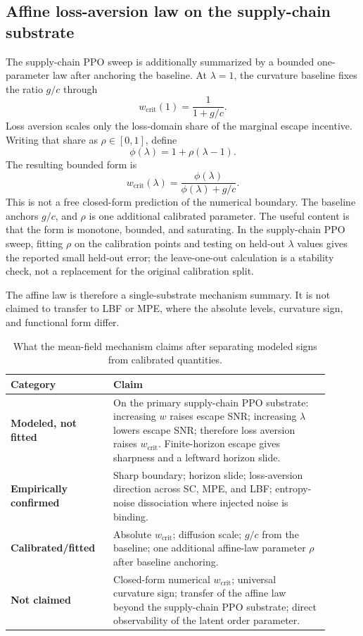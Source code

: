\documentclass[letterpaper]{article} %
\theoremstyle{plain}
\newcommand{\wcrit}{w_{\mathrm{crit}}}
\begin{document}
\subsection{Affine loss-aversion law on the supply-chain substrate}
The supply-chain PPO sweep is additionally summarized by a bounded one-parameter law after anchoring
the baseline. At $\lambda=1$, the curvature baseline fixes the ratio $g/c$ through
\begin{equation}
 \wcrit(1)=\frac{1}{1+g/c}.
\end{equation}
Loss aversion scales only the loss-domain share of the marginal escape incentive. Writing that
share as $\rho\in[0,1]$, define
\begin{equation}
 \phi(\lambda)=1+\rho(\lambda-1).
\end{equation}
The resulting bounded form is
\begin{equation}
 \wcrit(\lambda)=\frac{\phi(\lambda)}{\phi(\lambda)+g/c}.
 \label{eq:wcrit_lambda}
\end{equation}
This is not a free closed-form prediction of the numerical boundary. The baseline anchors $g/c$,
and $\rho$ is one additional calibrated parameter. The useful content is that the form is monotone,
bounded, and saturating. In the supply-chain PPO sweep, fitting $\rho$ on the calibration points and
testing on held-out $\lambda$ values gives the reported small held-out error; the leave-one-out
calculation is a stability check, not a replacement for the original calibration split.

The affine law is therefore a single-substrate mechanism summary. It is not claimed to transfer to
LBF or MPE, where the absolute levels, curvature sign, and functional form differ.

\begin{table}[t]
\centering
\caption{What the mean-field mechanism claims after separating modeled signs from calibrated
quantities.}
\label{tab:ledger_full}
\small
\begin{tabular}{p{0.28\linewidth}p{0.62\linewidth}}
\toprule
\textbf{Category} & \textbf{Claim} \\
\midrule
\textbf{Modeled, not fitted} &
On the primary supply-chain PPO substrate: increasing $w$ raises escape SNR; increasing $\lambda$
lowers escape SNR; therefore loss aversion raises $\wcrit$. Finite-horizon escape gives sharpness
and a leftward horizon slide. \\
\midrule
\textbf{Empirically confirmed} &
Sharp boundary; horizon slide; loss-aversion direction across SC, MPE, and LBF; entropy-noise
dissociation where injected noise is binding. \\
\midrule
\textbf{Calibrated/fitted} &
Absolute $\wcrit$; diffusion scale; $g/c$ from the baseline; one additional affine-law parameter
$\rho$ after baseline anchoring. \\
\midrule
\textbf{Not claimed} &
Closed-form numerical $\wcrit$; universal curvature sign; transfer of the affine law beyond the
supply-chain PPO substrate; direct observability of the latent order parameter. \\
\bottomrule
\end{tabular}
\end{table}
\end{document}
